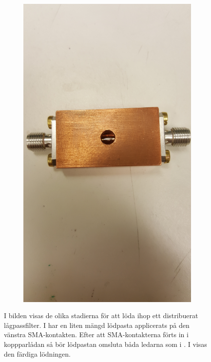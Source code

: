 \documentclass[main.tex]{subfiles}
\begin{document}
\begin{figure}[h]
\begin{subfigure}{0.25\textwidth}
        \includegraphics[angle=-90,trim=1200 100 1800 100,clip,width=0.97\linewidth]{figure/Filterbilder/filter_post_solder.jpg} 
        \caption{}
        \label{fig:post_solder}
    \end{subfigure}
    
 \caption{I bilden visas de olika stadierna för att löda ihop ett distribuerat lågpassfilter. I \protect{} har en liten mängd lödpasta applicerats på den vänstra SMA-kontakten. Efter att SMA-kontakterna förts in i koppparlådan så bör lödpastan omsluta båda ledarna som i . I  visas den färdiga lödningen.}
 \label{fig:filter_soldering}
\end{figure}
\end{document}
